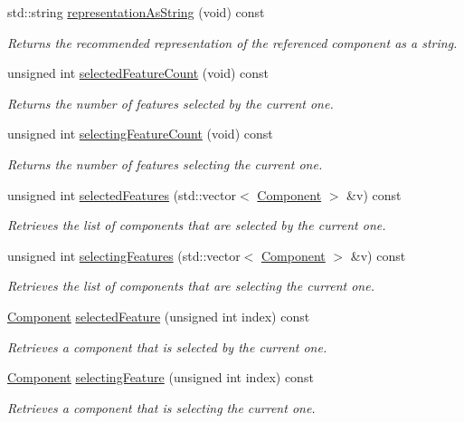 \begin{DoxyCompactItemize}
std\+::string \hyperlink{classmv_i_m_p_a_c_t_1_1acquire_1_1_component_ad4a9da484b7cb0bde08ed77c8d6221fe}{representation\+As\+String} (void) const 
\begin{DoxyCompactList}\small\item\em Returns the recommended representation of the referenced component as a string. \end{DoxyCompactList}\item 
unsigned int \hyperlink{classmv_i_m_p_a_c_t_1_1acquire_1_1_component_a17a328102430e483790a06769f85ea47}{selected\+Feature\+Count} (void) const 
\begin{DoxyCompactList}\small\item\em Returns the number of features selected by the current one. \end{DoxyCompactList}\item 
unsigned int \hyperlink{classmv_i_m_p_a_c_t_1_1acquire_1_1_component_abca6187054b1eefdabd8822c5d889320}{selecting\+Feature\+Count} (void) const 
\begin{DoxyCompactList}\small\item\em Returns the number of features selecting the current one. \end{DoxyCompactList}\item 
unsigned int \hyperlink{classmv_i_m_p_a_c_t_1_1acquire_1_1_component_a8be119dbf4cc277280df78b2570a8b80}{selected\+Features} (std\+::vector$<$ \hyperlink{classmv_i_m_p_a_c_t_1_1acquire_1_1_component}{Component} $>$ \&v) const 
\begin{DoxyCompactList}\small\item\em Retrieves the list of components that are selected by the current one. \end{DoxyCompactList}\item 
unsigned int \hyperlink{classmv_i_m_p_a_c_t_1_1acquire_1_1_component_ad57072c7362fdf4e714cab1f06f2574c}{selecting\+Features} (std\+::vector$<$ \hyperlink{classmv_i_m_p_a_c_t_1_1acquire_1_1_component}{Component} $>$ \&v) const 
\begin{DoxyCompactList}\small\item\em Retrieves the list of components that are selecting the current one. \end{DoxyCompactList}\item 
\hyperlink{classmv_i_m_p_a_c_t_1_1acquire_1_1_component}{Component} \hyperlink{classmv_i_m_p_a_c_t_1_1acquire_1_1_component_a38e5f6370991cf77ca8cdd3ecc99e64a}{selected\+Feature} (unsigned int index) const 
\begin{DoxyCompactList}\small\item\em Retrieves a component that is selected by the current one. \end{DoxyCompactList}\item 
\hyperlink{classmv_i_m_p_a_c_t_1_1acquire_1_1_component}{Component} \hyperlink{classmv_i_m_p_a_c_t_1_1acquire_1_1_component_ad8a74647397e051683b301cb92d86e9f}{selecting\+Feature} (unsigned int index) const 
\begin{DoxyCompactList}\small\item\em Retrieves a component that is selecting the current one. \end{DoxyCompactList}\end{DoxyCompactItemize}
